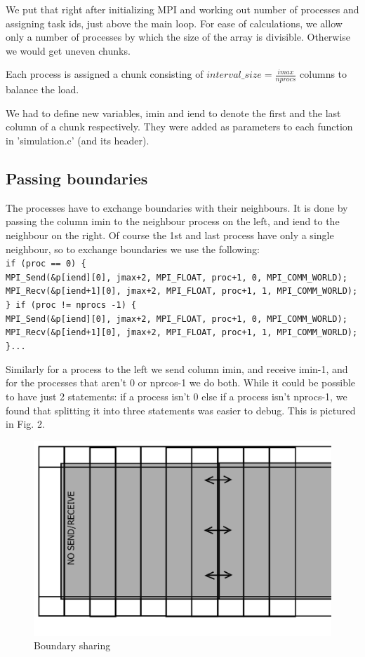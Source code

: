 \documentclass[11pt,journal]{article}
\newcommand\tab[1][1cm]{\hspace*{#1}}
\begin{document}
	We put that right after initializing MPI and working out number of processes and assigning task ids, just above the main loop. For ease of calculations, we allow only a number of processes by which the size of the array is divisible. Otherwise we would get uneven chunks.
	
	Each process is assigned a chunk consisting of $interval\_size = \frac{imax}{nprocs} $ columns to balance the load.
	
	We had to define new variables, imin and iend to denote the first and the last column of a chunk respectively. They were added as parameters to each function in 'simulation.c' (and its header).
	
	\subsection{Passing boundaries}
	The processes have to exchange boundaries with their neighbours. It is done by passing the column imin to the neighbour process on the left, and iend to the neighbour on the right. Of course the 1st and last process have only a single neighbour, so to exchange boundaries we use the following:
	\texttt{\\
	\tab if (proc == 0) \{  \\
	\tab \tab MPI\_Send(\&p[iend][0], jmax+2, MPI\_FLOAT, proc+1, 0, MPI\_COMM\_WORLD);\\
	\tab \tab MPI\_Recv(\&p[iend+1][0], jmax+2, MPI\_FLOAT, proc+1, 1, MPI\_COMM\_WORLD);\\
	\tab \}
	\tab if (proc != nprocs -1) \{  \\
	\tab \tab MPI\_Send(\&p[iend][0], jmax+2, MPI\_FLOAT, proc+1, 0, MPI\_COMM\_WORLD);\\
	\tab \tab MPI\_Recv(\&p[iend+1][0], jmax+2, MPI\_FLOAT, proc+1, 1, MPI\_COMM\_WORLD);\\
	\tab \}...
	}

	Similarly for a process to the left we send column imin, and receive imin-1,  and for the processes that aren't 0 or nprcos-1 we do both. While it could be possible to have just 2 statements: if a process isn't 0 else if a process isn't nprocs-1, we found that splitting it into three statements was easier to debug. This is pictured in Fig. 2.
	\begin{figure}[h]
		\centering
		\includegraphics[]{HPC_diag2.png}
		\caption{Boundary sharing}
	\end{figure}	
	
\end{document}
